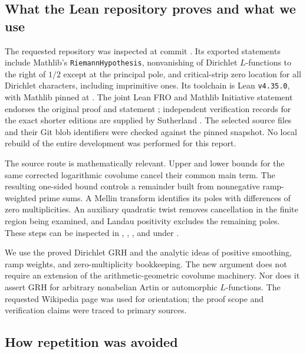 \documentclass[11pt]{article}
\theoremstyle{remark}\newtheorem{remark}[theorem]{Remark}
\begin{document}
\subsection{What the Lean repository proves and what we use}

The requested repository \cite{grh} was inspected at commit
.
Its exported statements include Mathlib's \texttt{RiemannHypothesis},
nonvanishing of Dirichlet $L$-functions to the right of $1/2$ except at
the principal pole, and critical-strip zero location for all Dirichlet
characters, including imprimitive ones. Its toolchain is Lean
\texttt{v4.35.0}, with Mathlib pinned at
.
The joint Lean FRO and Mathlib Initiative statement endorses the original
proof and statement \cite{leanstatement}; independent verification records
for the exact shorter editions are supplied by Sutherland \cite{sutherland}.
The selected source files and their Git blob identifiers were checked
against the pinned snapshot. No local rebuild of the entire development
was performed for this report.

The source route is mathematically relevant. Upper and lower bounds for
the same corrected logarithmic covolume cancel their common main term.
The resulting one-sided bound controls a remainder built from nonnegative
ramp-weighted prime sums. A Mellin transform identifies its poles with differences of
zero multiplicities. An auxiliary quadratic twist removes cancellation
in the finite region being examined, and Landau positivity excludes the
remaining poles. These steps can be inspected in
,
,
, and
 under .

We use the proved Dirichlet GRH and the analytic ideas of positive
smoothing, ramp weights, and zero-multiplicity bookkeeping. The new
argument does not require an extension of the arithmetic-geometric
covolume machinery. Nor does it assert GRH for arbitrary nonabelian
Artin or automorphic $L$-functions. The requested Wikipedia page
\cite{wiki} was used for orientation; the proof scope and verification
claims were traced to primary sources.

\subsection{How repetition was avoided}
\end{document}

